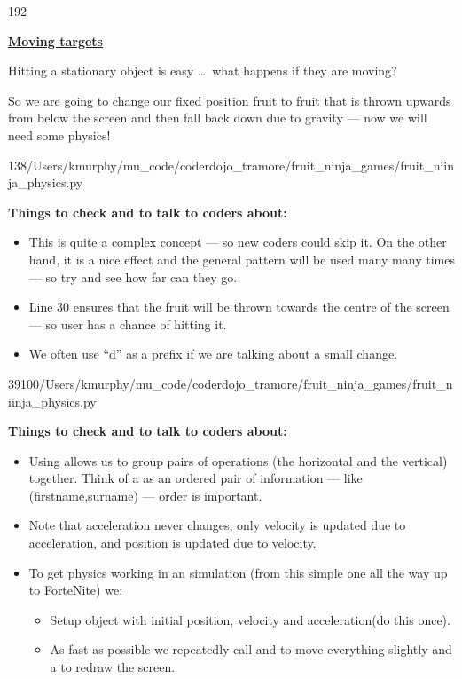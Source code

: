\documentclass{coderdojo}
\def\MUcode{/Users/kmurphy/mu_code/coderdojo_tramore/fruit_ninja_games/}
\newcommand\contentsitem[2]{
	\item \hyperref[#1]{\color{section}\bfseries #2}
}
\begin{document}
\begin{dingautolist}{192}
\clearpage

\enlargethispage{40pt}
\contentsitem{rectangle}{Moving targets}

Hitting a stationary object is easy \ldots\ what happens if they are moving?

So we are going to change our fixed position fruit to fruit that is thrown upwards from below the screen and then fall back down due to gravity --- now we will need some physics!

	{1}{38}{\MUcode}{fruit_niinja_physics.py}  

{\bf Things to check and to talk to coders about:}

\begin{itemize}
\item
This is quite a complex concept --- so new coders could skip it. On the other hand, it is a nice effect and the general pattern will be used many many times --- so try and see how far can they go.
\item
Line 30 ensures that the fruit will be thrown towards the centre of the screen --- so user has a chance of hitting it.
\item
We often use ``d'' as a prefix if we are talking about a small change.
\end{itemize}

	{39}{100}{\MUcode}{fruit_niinja_physics.py}  


{\bf Things to check and to talk to coders about:}

\begin{itemize}
\item
Using  allows us to group pairs of operations (the horizontal and the vertical) together.
Think of a  as an ordered pair of information --- like (firstname,surname) --- order is important.
\item 
Note that acceleration never changes, only velocity is updated due to acceleration, and position is updated due to velocity.
\item
To get physics working in an simulation (from this simple one all the way up to ForteNite) we:
\begin{itemize}
\item Setup object with initial position, velocity and acceleration\hfill (do this once).
\item As fast as possible we repeatedly call and  to move everything slightly and a  to redraw the screen.
\end{itemize}
\end{itemize}
\clearpage
	

\end{dingautolist}
\end{document}
